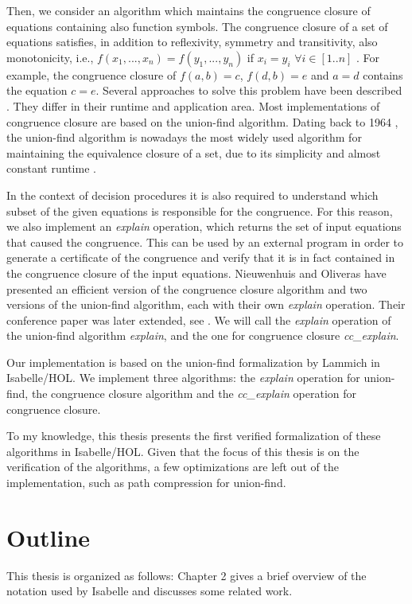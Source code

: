 Then, we consider an algorithm which maintains the congruence closure of equations containing also function symbols. The congruence closure of a set of equations satisfies, in addition to reflexivity, symmetry and transitivity, also monotonicity, i.e., $f(x_1, ... ,x_n) = f(y_1, ... ,y_n)$ if $x_i = y_i$ $\forall i \in [1..n]$ \cite{Nieuwenhuis}.
For example, the congruence closure of $f(a,b) = c$, $f(d,b) = e$ and $a = d$ contains the equation $c = e$. Several approaches to solve this problem have been described \cite{congruenceclosure-og2,congruenceclosure-og,congruenceclosure-og3,Nieuwenhuis}.
They differ in their runtime and application area.
Most implementations of congruence closure are based on the union-find algorithm. Dating back to 1964 \cite{unionfind-og}, the union-find algorithm is nowadays the most widely used algorithm for maintaining the equivalence closure of a set, due to its simplicity and almost constant runtime \cite{Tarjan}.

In the context of decision procedures it is also required to understand which subset of the given equations is responsible for the congruence. For this reason, we also implement an \emph{explain} operation, which returns the set of input equations that caused the congruence.
This can be used by an external program in order to generate a certificate of the congruence and verify that it is in fact contained in the congruence closure of the input equations.
Nieuwenhuis and Oliveras have presented an efficient version of the congruence closure algorithm and two versions of the union-find algorithm, each with their own \emph{explain} operation. Their conference paper \cite{Nieuwenhuis} was later extended, see \cite{Nieuwenhuis2}.
We will call the \emph{explain} operation of the union-find algorithm \emph{explain}, and the one for congruence closure \emph{cc\_explain}.


Our implementation is based on the union-find formalization by Lammich \cite{unionfind-isabelle} in Isabelle/HOL. We implement three algorithms: the \emph{explain} operation for union-find, the congruence closure algorithm and the \emph{cc\_explain} operation for congruence closure.

To my knowledge, this thesis presents the first verified formalization of these algorithms in Isabelle/HOL. Given that the focus of this thesis is on the verification of the algorithms, a few optimizations are left out of the implementation, such as path compression for union-find.

\section{Outline}
This thesis is organized as follows: Chapter 2 gives a brief overview of the notation used by Isabelle and discusses some related work.

